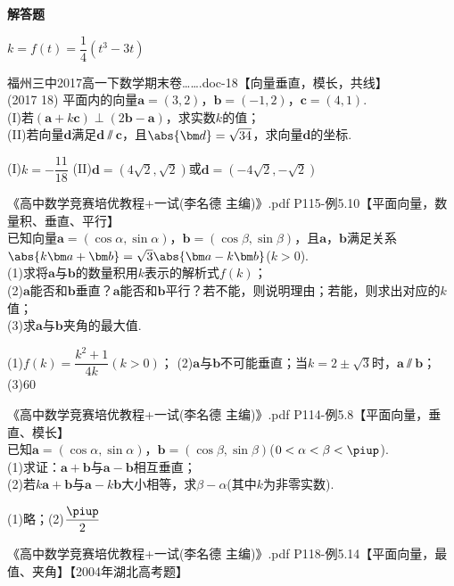 \begin{exercise}{\bf 解答题}
\begin{answer}
        $k=f(t)=\dfrac14(t^3-3t)$
      \end{answer}
    \item 福州三中2017高一下数学期末卷…….doc-18【向量垂直，模长，共线】\\
      (2017  18)
      平面内的向量$\bm a=(3,2)$，$\bm b=(-1,2)$，$\bm c=(4,1)$.\\
      (I)若$(\bm a+k\bm c)\perp(2\bm b-\bm a)$，求实数$k$的值；\\
      (II)若向量$\bm d$满足$\bm d\varparallel\bm c$，且$\abs{\bm d}=\sqrt{34}$，求向量$\bm d$的坐标.
      \begin{answer}
        (I)$k=-\dfrac{11}{18}$
        (II)$\bm d=(4\sqrt2,\sqrt2)$或$\bm d=(-4\sqrt2,-\sqrt2)$
      \end{answer}
    \item 《高中数学竞赛培优教程+一试(李名德 主编)》.pdf P115-例5.10【平面向量，数量积、垂直、平行】\\
      已知向量$\bm a=(\cos\alpha,\sin\alpha)$，$\bm b=(\cos\beta,\sin\beta)$，且$\bm a$，$\bm b$满足关系$\abs{k\bm a+\bm b}=\sqrt{3}\abs{\bm a-k\bm b}$($k>0$).\\
      (1)求将$\bm a$与$\bm b$的数量积用$k$表示的解析式$f(k)$；\\
      (2)\hspace{5pt}$\bm a$能否和$\bm b$垂直？$\bm a$能否和$\bm b$平行？若不能，则说明理由；若能，则求出对应的$k$值；\\
      (3)求$\bm a$与$\bm b$夹角的最大值.
      \begin{answer}
        (1)$f(k)=\dfrac{k^2+1}{4k} (k>0)$；
        (2)$\bm a$与$\bm b$不可能垂直；当$k=2\pm\sqrt{3}$时，$\bm a\varparallel \bm b$；
        (3)60\degree
      \end{answer}
    \item 《高中数学竞赛培优教程+一试(李名德 主编)》.pdf P114-例5.8【平面向量，垂直、模长】\\
      已知$\bm a=(\cos\alpha,\sin\alpha)$，$\bm b=(\cos\beta,\sin\beta)$($0<\alpha<\beta<\piup$).\\
      (1)求证：$\bm a+\bm b$与$\bm a-\bm b$相互垂直；\\
      (2)若$k\bm a+\bm b$与$\bm a-k\bm b$大小相等，求$\beta-\alpha$(其中$k$为非零实数).
      \begin{answer}
        (1)略；(2)$\dfrac{\piup}2$
      \end{answer}
    \item 《高中数学竞赛培优教程+一试(李名德 主编)》.pdf P118-例5.14【平面向量，最值、夹角】【2004年湖北高考题】\\

\end{exercise}
